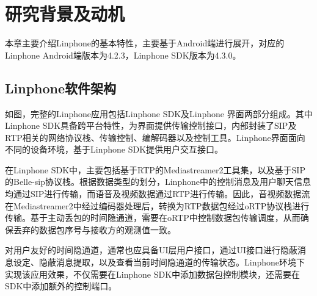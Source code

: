 \section{研究背景及动机}
\label{chap:linphone:motivation}

本章主要介绍Linphone的基本特性，主要基于Android端进行展开，对应的Linphone Android端版本为4.2.3，Linphone SDK版本为4.3.0。

\subsection{Linphone软件架构}
\label{chap:linphone:motivation:struct}


如图，完整的Linphone应用包括Linphone SDK及Linphone 界面两部分组成。其中Linphone SDK具备跨平台特性，为界面提供传输控制接口，内部封装了SIP及RTP相关的网络协议栈、传输控制、编解码器以及控制工具。Linphone界面面向不同的设备环境，基于Linphone SDK提供用户交互接口。

在Linphone SDK中，主要包括基于RTP的Mediastreamer2工具集，以及基于SIP的Belle-sip协议栈。根据数据类型的划分，Linphone中的控制消息及用户聊天信息均通过SIP进行传输，而语音及视频数据通过RTP进行传输。因此，音视频数据流在Mediastreamer2中经过编码器处理后，转换为RTP数据包经过oRTP协议栈进行传输。基于主动丢包的时间隐通道，需要在oRTP中控制数据包传输调度，从而确保丢弃的数据包序号与接收方的观测值一致。

对用户友好的时间隐通道，通常也应具备UI层用户接口，通过UI接口进行隐蔽消息设定、隐蔽消息提取，以及查看当前时间隐通道的传输状态。Linphone环境下实现该应用效果，不仅需要在Linphone SDK中添加数据包控制模块，还需要在SDK中添加额外的控制端口。

